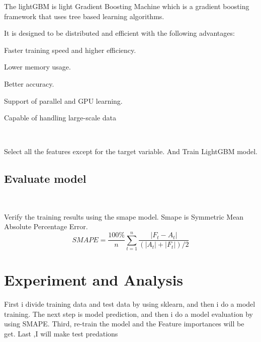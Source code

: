 The lightGBM is light Gradient Boosting Machine which is a gradient boosting framework that uses tree based learning algorithms. 
\ 

It is designed to be distributed and efficient with the following advantages:
\ 

\begin{description}
  \item  Faster training speed and higher efficiency.
  \item  Lower memory usage.
  \item  Better accuracy.
  \item  Support of parallel and GPU learning.
  \item  Capable of handling large-scale data
\end{description}
\ 

Select all the features except for the target variable. And Train LightGBM model.
\subsection{ Evaluate model}
\

Verify the training results using the smape model. Smape is Symmetric Mean Absolute Percentage Error.
\ 
\[SMAPE=\frac{100\%}{n}\sum_{t=1}^n\frac{|F_t-A_t|}{(|A_t|+|F_t|)/2} \]







\section{Experiment and Analysis}

First i divide training data and test data by using sklearn, and 
then i do a model training. The next step is model prediction, and 
then i do a model evaluation by using SMAPE. Third, re-train the 
model and the Feature importances will be get. Last ,I will make test predations

